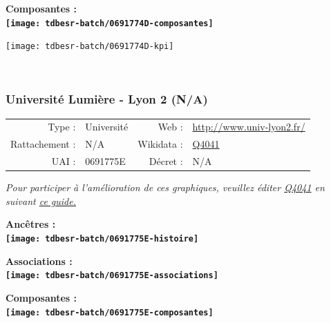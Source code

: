 \documentclass[12pt,french,]{article}
\begin{document}
\begin{center} \bf Composantes : \\  
\texttt{[image: tdbesr-batch/0691774D-composantes]} \end{center}

\begin{center}\texttt{[image: tdbesr-batch/0691774D-kpi]} \end{center}\checkoddpage

\ifoddpage \fi ~\newpage  

\hypertarget{universituxe9-lumiuxe8re---lyon-2-na}{%
\subsubsection{Université Lumière - Lyon 2
(N/A)}\label{universituxe9-lumiuxe8re---lyon-2-na}}

\begin{tabular*}{\textwidth}{rp{5cm}rl}  
\hline  
Type : & Université & Web : &\href{http://www.univ-lyon2.fr/}{http://www.univ-lyon2.fr/} \\  
Rattachement : & N/A & Wikidata : & \href{https://www.wikidata.org/entity/Q4041}{Q4041} \\  
UAI : & 0691775E & Décret : & N/A \\  
\hline  
\end{tabular*}

\textit{\scriptsize Pour participer à l'amélioration de ces graphiques, veuillez éditer  \href{https://www.wikidata.org/entity/Q4041}{Q4041}  en suivant \href{https://github.com/cpesr/wikidataESR/blob/master/Rmd/wikidataESR.md}{ce guide.}}

\vspace{1cm}  
\begin{minipage}[b]{0.50\textwidth}\begin{center} \bf Ancêtres : \\  
\texttt{[image: tdbesr-batch/0691775E-histoire]} \end{center}\end{minipage}\begin{minipage}[b]{0.50\textwidth}\begin{center} \bf Associations : \\  
\texttt{[image: tdbesr-batch/0691775E-associations]} \end{center}\end{minipage}

\hrulefill

\begin{center} \bf Composantes : \\  
\texttt{[image: tdbesr-batch/0691775E-composantes]} \end{center}
\end{document}
